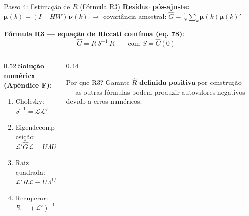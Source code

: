 \documentclass[aspectratio=169]{beamer}
\begin{document}
\begin{frame}{Passo 4: Estimação de $R$ (Fórmula R3)}
    \textbf{Resíduo pós-ajuste:}
    $\boldsymbol{\mu}(k) = (I - HW)\,\boldsymbol{\nu}(k)$
    \quad$\Rightarrow$\quad
    covariância amostral: $\hat{G} = \tfrac{1}{N}\sum_k \boldsymbol{\mu}(k)\boldsymbol{\mu}(k)'$

    \vspace{0.3cm}
    \textbf{Fórmula R3 — equação de Riccati contínua (eq. 78):}
    \[
        \hat{G} = R\,S^{-1}\,R \qquad \text{com } S = \hat{C}(0)
    \]

    \begin{columns}[T]
        \begin{column}{0.52\textwidth}
            \textbf{Solução numérica (Apêndice F):}
            \begin{enumerate}
                \item Cholesky: $S^{-1} = \mathscr{L}\mathscr{L}'$
                \item Eigendecomposição: $\mathscr{L}'\hat{G}\mathscr{L} = U\Lambda U'$
                \item Raiz quadrada: $\mathscr{L}'R\mathscr{L} = U\Lambda^{1/2}U'$
                \item Recuperar: $R = (\mathscr{L}')^{-1}U\Lambda^{1/2}U'\mathscr{L}^{-1}$
            \end{enumerate}
        \end{column}
        \begin{column}{0.44\textwidth}
            \begin{alertblock}{Por que R3?}
                Garante $\hat{R}$ \textbf{definida positiva}
                por construção — as outras fórmulas
                podem produzir autovalores negativos
                devido a erros numéricos.
            \end{alertblock}
        \end{column}
    \end{columns}
\end{frame}
\end{document}
